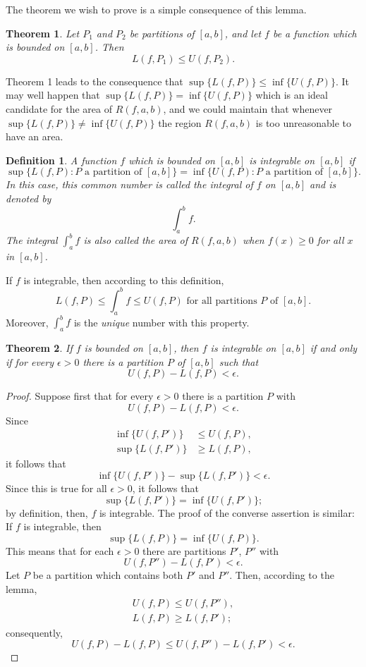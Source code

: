 \documentclass{article}
\newtheorem{definition}{Definition}
\newtheorem{theorem}{Theorem}
\begin{document}
The theorem we wish to prove is a simple consequence of this lemma.

\begin{theorem}
  Let $P_1$ and $P_2$ be partitions of $[a, b]$, and let $f$ be a function
  which is bounded on $[a, b]$. Then \[
    L(f, P_1) \leq U(f, P_2).
  \]
\end{theorem}

Theorem 1 leads to the consequence that $\sup\{L(f, P)\} \leq \inf\{U(f, P)\}$.
It may well happen that $\sup\{L(f, P)\} = \inf\{U(f, P)\}$ which is an ideal
candidate for the area of $R(f, a, b)$, and we could maintain that whenever
$\sup\{L(f, P)\} \neq \inf\{U(f, P)\}$ the region $R(f, a, b)$ is too
unreasonable to have an area.

\begin{definition}
  A function $f$ which is bounded on $[a, b]$ is \emph{integrable} on $[a, b]$
  if \[
    \sup\{L(f, P): P \text{ a partition of } [a, b]\}
    = \inf\{U(f, P): P \text{ a partition of } [a, b]\}.
  \] In this case, this common number is called the \emph{integral} of $f$ on
  $[a, b]$ and is denoted by \[
    \int_a^b f.
  \] The integral $\int_a^b f$ is also called the \emph{area} of $R(f, a, b)$
  when $f(x) \geq 0$ for all $x$ in $[a, b]$.
\end{definition}

If $f$ is integrable, then according to this definition, \[
  L(f, P) \leq \int_a^b f
  \leq U(f, P) \text{ for all partitions } P \text{ of } [a, b].
\] Moreover, $\int_a^b f$ is the \emph{unique} number with this property.

\begin{theorem}
  If $f$ is bounded on $[a, b]$, then $f$ is integrable on $[a, b]$ if and only
  if for every $\epsilon > 0$ there is a partition $P$ of $[a, b]$ such that \[
    U(f, P) - L(f, P) < \epsilon.
  \]
\end{theorem}
\begin{proof}
  Suppose first that for every $\epsilon > 0$ there is a partition $P$ with \[
    U(f, P) - L(f, P) < \epsilon.
  \] Since
  \begin{align*}
    \inf\{U(f, P')\} &\leq U(f, P), \\
    \sup\{L(f, P')\} &\geq L(f, P),
  \end{align*}
  it follows that \[
    \inf\{U(f, P')\} - \sup\{L(f, P')\} < \epsilon.
  \] Since this is true for all $\epsilon > 0$, it follows that \[
    \sup\{L(f, P')\} = \inf\{U(f, P')\};
  \] by definition, then, $f$ is integrable. The proof of the converse
  assertion is similar: If $f$ is integrable, then \[
    \sup\{L(f, P)\} = \inf\{U(f, P)\}.
  \] This means that for each $\epsilon > 0$ there are partitions $P'$, $P''$
  with \[
    U(f, P'') - L(f, P') < \epsilon.
  \] Let $P$ be a partition which contains both $P'$ and $P''$. Then, according
  to the lemma,
  \begin{align*}
    U(f, P) \leq U(f, P''), \\
    L(f, P) \geq L(f, P');
  \end{align*}
  consequently, \[
    U(f, P) - L(f, P) \leq U(f, P'') - L(f, P') < \epsilon.
  \]
\end{proof}
\end{document}
